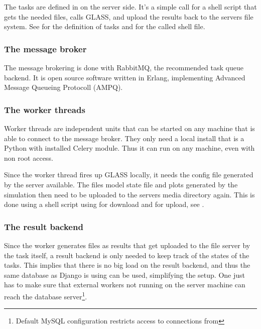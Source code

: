 
The tasks are defined in  on the server side.
It's a simple call for a shell script that gets the needed files, calls GLASS, and upload the results back to the servers file system.
See  for the definition of tasks and  for the called shell file.



\subsubsection{The message broker}

The message brokering is done with RabbitMQ, the recommended task queue backend.
It is open source software written in Erlang, implementing Advanced Message Queueing Protocoll (AMPQ).

\subsubsection{The worker threads}

Worker threads are independent units that can be started on any machine that is able to connect to the message broker. They only need a local install that is a Python with installed Celery module.
Thus it can run on any machine, even with non root access.

Since the worker thread fires up GLASS locally, it needs the config file generated by the server available. The files model state file and plots generated by the simulation then need to be uploaded to the servers media directory again.
This is done using a shell script using  for download and  for upload, see .




\subsubsection{The result backend}
Since the worker generates files as results that get uploaded to the file server by the task itself, a result backend is only needed to keep track of the states of the tasks.
This implies that there is no big load on the result backend, and thus the same database as Django is using can be used, simplifying the setup.
One just has to make sure that external workers not running on the server machine can reach the database server\footnote{Default MySQL configuration restricts access to connections from }.




